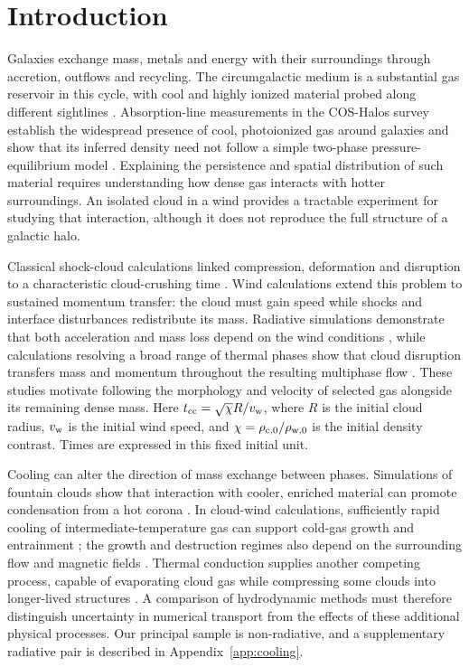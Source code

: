\documentclass[twocolumn,apj,numberedappendix]{openjournal}
\begin{document}
\section{Introduction}
Galaxies exchange mass, metals and energy with their surroundings through accretion, outflows and recycling. The circumgalactic medium is a substantial gas reservoir in this cycle, with cool and highly ionized material probed along different sightlines \citep{Tumlinson2017}. Absorption-line measurements in the COS-Halos survey establish the widespread presence of cool, photoionized gas around galaxies and show that its inferred density need not follow a simple two-phase pressure-equilibrium model \citep{Werk2014}. Explaining the persistence and spatial distribution of such material requires understanding how dense gas interacts with hotter surroundings. An isolated cloud in a wind provides a tractable experiment for studying that interaction, although it does not reproduce the full structure of a galactic halo.

Classical shock-cloud calculations linked compression, deformation and disruption to a characteristic cloud-crushing time \citep{Klein1994}. Wind calculations extend this problem to sustained momentum transfer: the cloud must gain speed while shocks and interface disturbances redistribute its mass. Radiative simulations demonstrate that both acceleration and mass loss depend on the wind conditions \citep{Scannapieco2015}, while calculations resolving a broad range of thermal phases show that cloud disruption transfers mass and momentum throughout the resulting multiphase flow \citep{Schneider2017}. These studies motivate following the morphology and velocity of selected gas alongside its remaining dense mass. Here $t_{\rm cc}=\sqrt{\chi}R/v_{\rm w}$, where $R$ is the initial cloud radius, $v_{\rm w}$ is the initial wind speed, and $\chi=\rho_{\rm c,0}/\rho_{\rm w,0}$ is the initial density contrast. Times are expressed in this fixed initial unit.

Cooling can alter the direction of mass exchange between phases. Simulations of fountain clouds show that interaction with cooler, enriched material can promote condensation from a hot corona \citep{Armillotta2016}. In cloud-wind calculations, sufficiently rapid cooling of intermediate-temperature gas can support cold-gas growth and entrainment \citep{GronkeOh2018}; the growth and destruction regimes also depend on the surrounding flow and magnetic fields \citep{Sparre2020}. Thermal conduction supplies another competing process, capable of evaporating cloud gas while compressing some clouds into longer-lived structures \citep{Bruggen2016}. A comparison of hydrodynamic methods must therefore distinguish uncertainty in numerical transport from the effects of these additional physical processes. Our principal sample is non-radiative, and a supplementary radiative pair is described in Appendix~\ref{app:cooling}.
\end{document}
